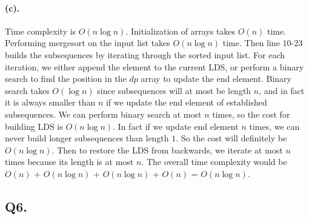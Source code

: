 \documentclass[12pt]{article}
\begin{document}
\paragraph{(c).} Time complexity is \(O(n\log n)\). Initialization of arrays takes \(O(n)\) time. Performing mergesort on the input list takes \(O(n\log n)\) time. Then line \(10\text{-}23\) builds the subsequences by iterating through the sorted input list. For each iteration, we either append the element to the current LDS, or perform a binary search to find the position in the \(dp\) array to update the end element. Binary search takes \(O(\log n)\) since subsequences will at most be length \(n\), and in fact it is always smaller than \(n\) if we update the end element of established subsequences. We can perform binary search at most \(n\) times, so the cost for building LDS is \(O(n\log n)\). In fact if we update end element \(n\) times, we can never build longer subsequences than length \(1\). So the cost will definitely be \(O(n\log n)\). Then to restore the LDS from backwards, we iterate at most \(n\) times because its length is at most \(n\). The overall time complexity would be \(O(n)\) + \(O(n\log n)\) + \(O(n\log n)\) + \(O(n)\) = \(O(n\log n)\).

\subsection*{Q6.}
\end{document}
